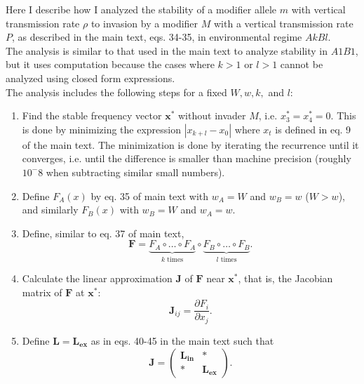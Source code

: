 \documentclass[11pt, oneside]{article}   	%
\let\vec\mathbf
\begin{document}
Here I describe how I analyzed the stability of a modifier allele $m$ with vertical transmission rate $\rho$ to invasion by a modifier $M$ with a vertical transmission rate $P$, as described in the main text, eqs. 34-35, in environmental regime $AkBl$.
\\
The analysis is similar to that used in the main text to analyze stability in $A1B1$, but it uses computation because the cases where $k>1$ or $l>1$ cannot be analyzed using closed form expressions.
\\
The analysis includes the following steps for a fixed $W, w, k,$ and $l$:
\begin{enumerate}

\item Find the stable frequency vector $\vec{x^*}$ without invader $M$, i.e. $x^*_3=x^*_4=0$. This is done by minimizing the expression $|x_{k+l} - x_{0}|$ where $x_{t}$ is defined in eq. 9 of the main text. The minimization is done by iterating the recurrence until it converges, i.e. until the difference is smaller than machine precision (roughly $10^-8$ when subtracting similar small numbers).

\item Define $F_A(x)$ by eq. 35 of main text with $w_A=W$ and $w_B=w$ ($W>w$), and similarly $F_B(x)$ with $w_B=W$ and $w_A=w$.

\item Define, similar to eq. 37 of main text,
\begin{equation}
\vec{F} = \underbrace{F_A \circ \ldots \circ F_A}_{k \text{ times}} \circ
	\underbrace{F_B \circ \ldots \circ F_B}_{l \text{ times}}.
\label{eq:F}\end{equation}

\item Calculate the linear approximation $\vec{J}$ of $\vec{F}$  near $\vec{x^*}$, that is, the Jacobian matrix of $\vec{F}$ at $\vec{x^*}$:
\begin{equation}
\vec{J}_{ij} = \frac{\partial F_i}{\partial x_j}.
\label{eq:jacobian}\end{equation}

\item Define $\vec{L}=\vec{L_{ex}}$ as in eqs. 40-45 in the main text such that
\begin{equation}
\vec{J} = \begin{pmatrix}
\vec{L_{in}} & * \\
* & \vec{L_{ex}}
\end{pmatrix}.
\end{equation}


\end{enumerate}
\end{document}
